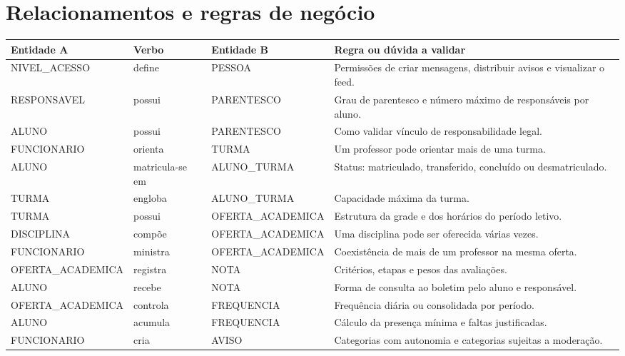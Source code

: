 \section{Relacionamentos e regras de negócio}
\begin{table}[!ht]\centering\scriptsize\renewcommand{\arraystretch}{1.38}
\begin{tabularx}{\linewidth}{|>{\raggedright\arraybackslash}p{2.9cm}|>{\centering\arraybackslash}p{1.4cm}|>{\raggedright\arraybackslash}p{2.8cm}|>{\raggedright\arraybackslash}X|}
\hline
\textbf{Entidade A} & \textbf{Verbo} & \textbf{Entidade B} & \textbf{Regra ou dúvida a validar} \\
\hline
NIVEL\_ACESSO & define & PESSOA & Permissões de criar mensagens, distribuir avisos e visualizar o feed. \\
\hline RESPONSAVEL & possui & PARENTESCO & Grau de parentesco e número máximo de responsáveis por aluno. \\
\hline ALUNO & possui & PARENTESCO & Como validar vínculo de responsabilidade legal. \\
\hline FUNCIONARIO & orienta & TURMA & Um professor pode orientar mais de uma turma. \\
\hline ALUNO & matricula-se em & ALUNO\_TURMA & Status: matriculado, transferido, concluído ou desmatriculado. \\
\hline TURMA & engloba & ALUNO\_TURMA & Capacidade máxima da turma. \\
\hline TURMA & possui & OFERTA\_ACADEMICA & Estrutura da grade e dos horários do período letivo. \\
\hline DISCIPLINA & compõe & OFERTA\_ACADEMICA & Uma disciplina pode ser oferecida várias vezes. \\
\hline FUNCIONARIO & ministra & OFERTA\_ACADEMICA & Coexistência de mais de um professor na mesma oferta. \\
\hline OFERTA\_ACADEMICA & registra & NOTA & Critérios, etapas e pesos das avaliações. \\
\hline ALUNO & recebe & NOTA & Forma de consulta ao boletim pelo aluno e responsável. \\
\hline OFERTA\_ACADEMICA & controla & FREQUENCIA & Frequência diária ou consolidada por período. \\
\hline ALUNO & acumula & FREQUENCIA & Cálculo da presença mínima e faltas justificadas. \\
\hline FUNCIONARIO & cria & AVISO & Categorias com autonomia e categorias sujeitas a moderação. \\

\end{tabularx}
\end{table}
